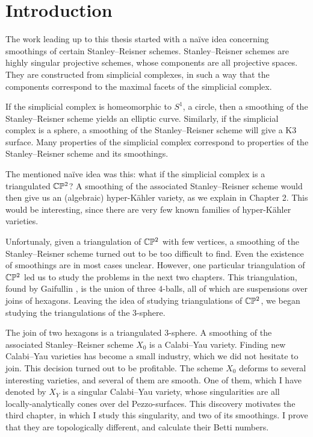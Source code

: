 \chapter{Introduction}
\label{sec:intro}

The work leading up to this thesis started with a naïve idea concerning smoothings of certain Stanley--Reisner schemes. Stanley--Reisner schemes are highly singular projective schemes, whose components are all projective spaces. They are constructed from simplicial complexes, in such a way that the components correspond to the maximal facets of the simplicial complex. 

If the simplicial complex is homeomorphic to $S^1$, a circle, then a smoothing of the Stanley--Reisner scheme yields an elliptic curve. Similarly, if the simplicial complex is a sphere, a smoothing of the Stanley--Reisner scheme will give a K3 surface. Many properties of the simplicial complex correspond to properties of the Stanley--Reisner scheme and its smoothings. 

The mentioned naïve idea was this: what if the simplicial complex is a triangulated $\mathbb{C} \mathbb{P}^2$? A smoothing of the associated Stanley--Reisner scheme would then give us an (algebraic) hyper-Kähler variety, as we explain in Chapter 2. This would be interesting, since there are very few known families of hyper-Kähler varieties.

Unfortunaly, given a triangulation of $\mathbb{C} \mathbb{P}^2$ with few vertices, a smoothing of the Stanley--Reisner scheme turned out to be too difficult to find. Even the existence of smoothings are in most cases unclear. However, one particular triangulation of $\mathbb{C} \mathbb{P}^2$ led us to study the problems in the next two chapters. This triangulation, found by Gaifullin \cite{cp2_15_chess}, is the union of three $4$-balls, all of which are suspensions over joins of hexagons. Leaving the idea of studying triangulations of $\mathbb{C} \mathbb{P}^2$, we began studying the triangulations of the $3$-sphere.

The join of two hexagons is a triangulated $3$-sphere. A smoothing of the associated Stanley--Reisner scheme $X_0$ is a Calabi--Yau variety. Finding new Calabi--Yau varieties has become a small industry, which we did not hesitate to join. This decision turned out to be profitable. The scheme $X_0$ deforms to several interesting varieties, and several of them are smooth. One of them, which I have denoted by $X_Y$ is a singular Calabi--Yau variety, whose singularities are all locally-analytically cones over del Pezzo-surfaces. This discovery motivates the third chapter, in which I study this singularity, and two of its smoothings. I prove that they are topologically different, and calculate their Betti numbers.

